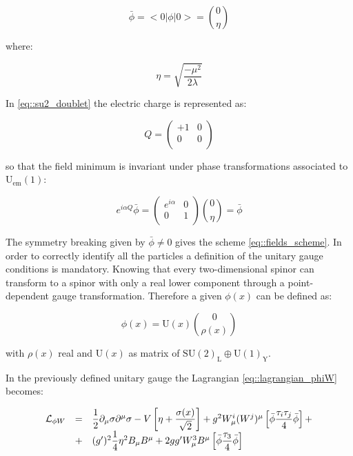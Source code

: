 \begin{equation}
 \bar{\phi}= < 0|\phi|0 > = \binom{0}{\eta}
 \label{eq::vacuum_expectation}
\end{equation}

where:

\begin{equation}
\eta = \sqrt{\dfrac{-\mu^{2}}{2\lambda}}
\label{eq::eta_value}
\end{equation}

In \autoref{eq::su2_doublet} the electric charge is represented as:

\begin{equation}
Q = 
\begin{pmatrix}
+1 & 0 \\
0 & 0 \\
\end{pmatrix}
\end{equation}

so that the field minimum is invariant under phase transformations associated to $\text{U}_{\text{em}}(1)$:

\begin{equation}
e^{i\alpha Q} \bar{\phi} = 
\begin{pmatrix}
e^{i\alpha} & 0 \\
0 & 1 \\ 
\end{pmatrix}
\binom{0}{\eta}
= \bar{\phi}
\end{equation}

The symmetry breaking given by $\bar{\phi} \neq 0$ gives the scheme \ref{eq::fields_scheme}.
In order to correctly identify all the particles a definition of the unitary gauge conditions is mandatory. Knowing that every two-dimensional spinor can transform to a spinor with only a real lower component through a point-dependent gauge transformation. Therefore a given $\phi(x)$
can be defined as:

\begin{equation}
\phi(x) = \text{U}(x) \binom{0}{\rho(x)}
\end{equation}

with $\rho(x)$ real and $\text{U}(x)$ as matrix of $ \text{SU}(2)_{\text{L}} \oplus \text{U}(1)_{\text{Y}}$. 

In the previously defined unitary gauge the Lagrangian \ref{eq::lagrangian_phiW} becomes:

\begin{equation}
\begin{array}{l c l}
\mathcal{L}_{\phi W}&=&\dfrac{1}{2} \partial_{\mu} \sigma \partial^{\mu} \sigma - V \left[ \eta + \dfrac{\sigma(x)}{\sqrt{2}}\right] + g^{2} W_{\mu}^{i}(W^{j})^{\mu} \left[ \bar{\phi} \dfrac{\tau_{i}\tau_{j}}{4}\bar{\phi}\right] +\\
&+&(g^{\prime})^{2} \dfrac{1}{4}\eta^{2} B_{\mu} B^{\mu} + 2 gg^{\prime} W^{3}_{\mu} B^{\mu} \left[ \bar{\phi} \dfrac{\tau_{3}}{4} \bar{\phi} \right]
\end{array}
\end{equation}

